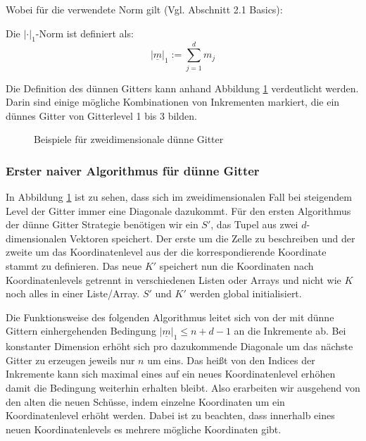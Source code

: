 \documentclass[a4paper,12pt]{llncs}
\numberwithin{equation}{section}
\begin{document}
Wobei für die verwendete Norm gilt (Vgl. \cite{P10} Abschnitt 2.1 Basics):

\begin{definition}
Die  $|\cdot|_1$-Norm ist definiert als:
	\begin{equation}
	|\underline{m}|_1:=\sum_{j=1}^d m_j
	\end{equation}
\end{definition}


Die Definition des dünnen Gitters kann anhand Abbildung \ref{fig:gitter03} verdeutlicht werden. Darin sind einige mögliche Kombinationen von Inkrementen markiert, die ein dünnes Gitter von Gitterlevel 1 bis 3 bilden.

\begin{figure}
	\caption{Beispiele für zweidimensionale dünne Gitter}
	\label{fig:gitter03}
\end{figure}

\subsubsection{Erster naiver Algorithmus für dünne Gitter}

In Abbildung \ref{fig:gitter03} ist zu sehen, dass sich im zweidimensionalen Fall bei steigendem Level der Gitter immer eine Diagonale dazukommt. Für den ersten Algorithmus der dünne Gitter Strategie benötigen wir ein $S'$, das Tupel aus zwei $d$-dimensionalen Vektoren speichert. Der erste um die Zelle zu beschreiben und der zweite um das Koordinatenlevel aus der die korrespondierende Koordinate stammt zu definieren. Das neue $K'$ speichert nun die Koordinaten nach Koordinatenlevels getrennt in verschiedenen Listen oder Arrays und nicht wie $K$ noch alles in einer Liste/Array. $S'$ und $K'$ werden global initialisiert.

Die Funktionsweise des folgenden Algorithmus leitet sich von der mit dünne Gittern einhergehenden Bedingung $|\underline{m}|_1\leq n+d-1$ an die Inkremente ab. Bei konstanter Dimension erhöht sich pro dazukommende Diagonale um das nächste Gitter zu erzeugen jeweils nur $n$ um eins. Das heißt von den Indices der Inkremente kann sich maximal eines auf ein neues Koordinatenlevel erhöhen damit die Bedingung weiterhin erhalten bleibt. Also erarbeiten wir ausgehend von den alten die neuen Schüsse, indem einzelne Koordinaten um ein Koordinatenlevel erhöht werden. Dabei ist zu beachten, dass innerhalb eines neuen Koordinatenlevels es mehrere mögliche Koordinaten gibt. 
\end{document}
